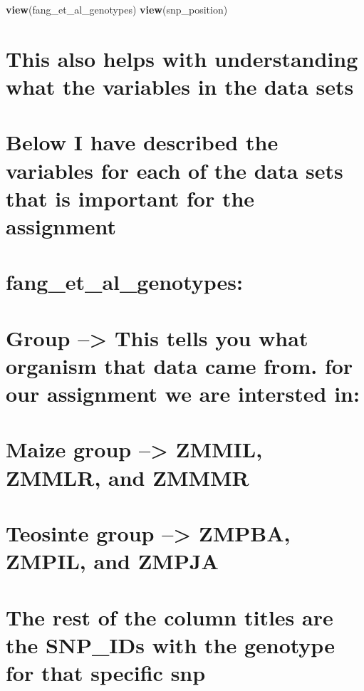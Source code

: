 \documentclass[
]{article}
\newenvironment{Shaded}{\begin{snugshade}}{\end{snugshade}}
\newcommand{\FunctionTok}[1]{\textcolor[rgb]{0.13,0.29,0.53}{\textbf{#1}}}
\newcommand{\NormalTok}[1]{#1}
\begin{document}
\begin{Shaded}
\begin{Highlighting}[]
\FunctionTok{view}\NormalTok{(fang\_et\_al\_genotypes)}
\FunctionTok{view}\NormalTok{(snp\_position)}
\end{Highlighting}
\end{Shaded}

\section{This also helps with understanding what the variables in the
data
sets}\label{this-also-helps-with-understanding-what-the-variables-in-the-data-sets}

\section{Below I have described the variables for each of the data sets
that is important for the
assignment}\label{below-i-have-described-the-variables-for-each-of-the-data-sets-that-is-important-for-the-assignment}

\section{fang\_et\_al\_genotypes:}\label{fang_et_al_genotypes}

\section{Group --\textgreater{} This tells you what organism that data
came from. for our assignment we are intersted
in:}\label{group-this-tells-you-what-organism-that-data-came-from.-for-our-assignment-we-are-intersted-in}

\section{Maize group --\textgreater{} ZMMIL, ZMMLR, and
ZMMMR}\label{maize-group-zmmil-zmmlr-and-zmmmr}

\section{Teosinte group --\textgreater{} ZMPBA, ZMPIL, and
ZMPJA}\label{teosinte-group-zmpba-zmpil-and-zmpja}

\section{The rest of the column titles are the SNP\_IDs with the
genotype for that specific
snp}\label{the-rest-of-the-column-titles-are-the-snp_ids-with-the-genotype-for-that-specific-snp}
\end{document}
